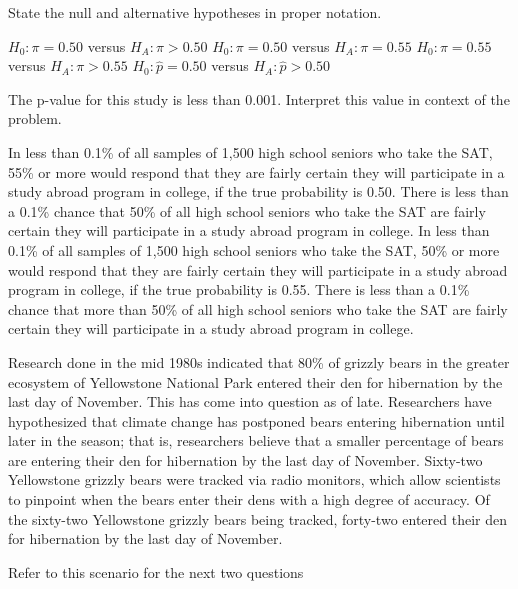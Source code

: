 \documentclass{article}
\begin{document}
\begin{mcquestions}
		\question[follow] State the null and alternative hypotheses in proper notation.
		\begin{mcanswerslist}
			\answer[correct] \(H_0: \pi = 0.50\) versus \(H_A: \pi > 0.50\)
			\answer \(H_0: \pi = 0.50\) versus \(H_A: \pi = 0.55 \)
			\answer \(H_0: \pi = 0.55\) versus \(H_A: \pi > 0.55\)
			\answer \(H_0: \hat p = 0.50\) versus \(H_A: \hat p > 0.50\)
		\end{mcanswerslist}
		
		\question[follow] The p-value for this study is less than 0.001. Interpret this value in context of the problem.
		\begin{mcanswerslist}
			\answer[correct] In less than 0.1\% of all samples of 1,500 high school seniors who take the SAT, 55\% or more would respond that they are fairly certain they will participate in a study abroad program in college, if the true probability is 0.50.
			\answer There is less than a 0.1\% chance that 50\% of all high school seniors who take the SAT are fairly certain they will participate in a study abroad program in college.
			\answer In less than 0.1\% of all samples of 1,500 high school seniors who take the SAT, 50\% or more would respond that they are fairly certain they will participate in a study abroad program in college, if the true probability is 0.55.
			\answer There is less than a 0.1\% chance that more than 50\% of all high school seniors who take the SAT are fairly certain they will participate in a study abroad program in college.
		\end{mcanswerslist}
		
		\begin{mcquestioninstruction}
			Research done in the mid 1980s indicated that 80\% of grizzly bears in the greater ecosystem of Yellowstone National Park entered their den for hibernation by the last day of November. This has come into question as of late. Researchers have hypothesized that climate change has postponed bears entering hibernation until later in the season; that is, researchers believe that a smaller percentage of bears are entering their den for hibernation by the last day of November. Sixty-two Yellowstone grizzly bears were tracked via radio monitors, which allow scientists to pinpoint when the bears enter their dens with a high degree of accuracy. Of the sixty-two Yellowstone grizzly bears being tracked, forty-two entered their den for hibernation by the last day of November.
			
			Refer to this scenario for the next two questions
		\end{mcquestioninstruction}
		

\end{mcquestions}
\end{document}
